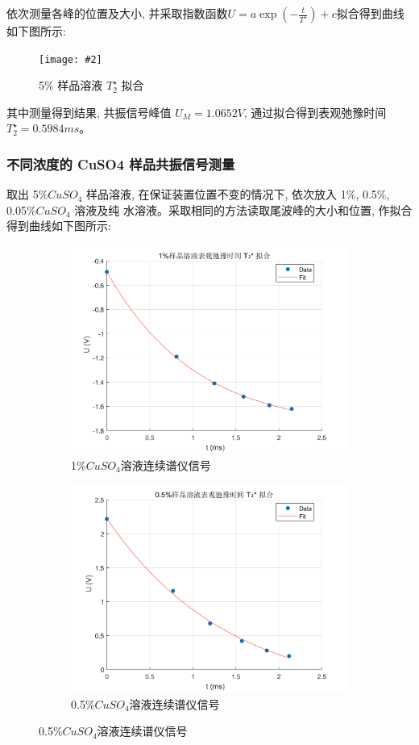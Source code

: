 \documentclass[12pt,a4paper]{article}
\newcommand{\bfig}[3]{
    \begin{figure}[H]
        \centering
        \texttt{[image: \#2]}
        \caption{#3}
    \end{figure}
}
\begin{document}
依次测量各峰的位置及大小, 并采取指数函数$U=a \exp \left(-\frac{t}{T^{\star}}\right)+c$拟合得到曲线如下图所示:
\bfig{0.6}{5弛豫时间拟合.png}{5\% 样品溶液 $T_2^{\star}$ 拟合}
其中测量得到结果, 共振信号峰值 $U_M = 1.0652V$, 通过拟合得到表观弛豫时间 $T_2^{\star} = 0.5984ms$。

\subsubsection{不同浓度的 CuSO4 样品共振信号测量}
取出 5\%$CuS O_4$ 样品溶液, 在保证装置位置不变的情况下, 依次放入 1\%, 0.5\%, 0.05\%$CuS O_4$ 溶液及纯
水溶液。采取相同的方法读取尾波峰的大小和位置, 作拟合得到曲线如下图所示:

\begin{figure}[ht]
\centering
\begin{subfigure}[b]{0.45\textwidth}
    \includegraphics[width=\textwidth]{1弛豫时间拟合.png}
    \caption{1\%$CuSO_4$溶液连续谱仪信号}
\end{subfigure}
\hfill
\begin{subfigure}[b]{0.45\textwidth}
    \includegraphics[width=\textwidth]{05弛豫时间拟合.png}
    \caption{0.5\%$CuSO_4$溶液连续谱仪信号}
\end{subfigure}


\end{figure}
\end{document}
